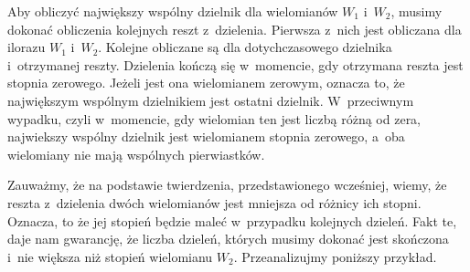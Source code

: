 \begin{theorem}
	$ $\\
	Aby obliczyć największy wspólny dzielnik dla wielomianów $W_1$ i~$W_2$, musimy dokonać obliczenia kolejnych reszt z~dzielenia. Pierwsza z~nich jest obliczana dla ilorazu $W_1$ i~$W_2$. Kolejne obliczane są dla dotychczasowego dzielnika i~otrzymanej reszty. Dzielenia kończą się w~momencie, gdy otrzymana reszta jest stopnia zerowego. Jeżeli jest ona wielomianem zerowym, oznacza to, że największym wspólnym dzielnikiem jest ostatni dzielnik. W~przeciwnym wypadku, czyli w~momencie, gdy wielomian ten jest liczbą różną od zera, najwiekszy wspólny dzielnik jest wielomianem stopnia zerowego, a~oba wielomiany nie mają wspólnych pierwiastków. 
\end{theorem}

Zauważmy, że na podstawie twierdzenia, przedstawionego wcześniej, wiemy, że reszta z~dzielenia dwóch wielomianów jest mniejsza od różnicy ich stopni. Oznacza, to że jej stopień będzie maleć w~przypadku kolejnych dzieleń. Fakt te, daje nam gwarancję, że liczba dzieleń, których musimy dokonać jest skończona i~nie większa niż stopień wielomianu $W_2$. Przeanalizujmy poniższy przykład.

